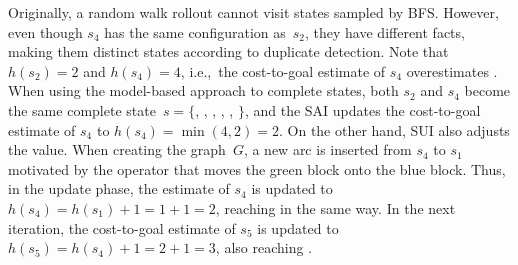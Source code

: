 Originally, a random walk rollout cannot visit states sampled by BFS. However, even though $s_4$ has the same configuration as~$s_2$, they have different facts, making them distinct states according to duplicate detection. Note that $h(s_2)=2$ and $h(s_4)=4$, i.e.,~the cost-to-goal estimate of $s_4$ overestimates \hstar. When using the model-based approach to complete states, both $s_2$ and $s_4$ become the same complete state~$s = \{$\mbox{}, \mbox{}, \mbox{}, \mbox{}, \mbox{}, \mbox{}$\}$, and the SAI updates the cost-to-goal estimate of $s_4$ to $h(s_4)=\min(4,2)=2$. On the other hand, SUI also adjusts the value. When creating the graph~$G$, a new arc is inserted from $s_4$ to $s_1$ motivated by the operator that moves the green block onto the blue block. Thus, in the update phase, the estimate of $s_4$ is updated to $h(s_4)=h(s_1)+1=1+1=2$, reaching \hstar in the same way. In the next iteration, the cost-to-goal estimate of $s_5$ is updated to $h(s_5)=h(s_4)+1=2+1=3$, also reaching \hstar.

